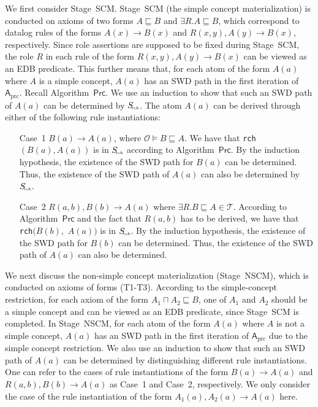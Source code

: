 We first consider Stage~SCM.
Stage~SCM (the simple concept materialization) is conducted on axioms of two forms $A\sqsubseteq B$
and $\exists R.A\sqsubseteq B$, which correspond to datalog rules of the forms $A(x)\rightarrow B(x)$
and $R(x,y),A(y)\rightarrow B(x)$, respectively. Since role assertions are supposed to be fixed
during Stage~SCM, the role $R$ in each rule of the form $R(x,y),A(y)\rightarrow B(x)$
can be viewed as an EDB predicate. This further means that,
for each atom of the form $A(a)$ where $A$ is a simple concept,
$A(a)$ has an SWD path in the first iteration of $\mathsf{A}_{\text{prc}}$.
Recall Algorithm~$\mathsf{Prc}$. We use an induction to show that
such an SWD path of $A(a)$ can be determined by $S_{\textit{\!\tiny rch}}$.
The atom $A(a)$ can be derived through either of the following rule instantiations:

\begin{enumerate}[leftmargin=12ex]
\item[Case~1] $B(a)\rightarrow A(a)$, where $\mathcal{O}\models
  B\sqsubseteq A$. We have
    that \texttt{rch}$(B(a),A(a))$ is in $S_{\textit{\!\tiny rch}}$ according to Algorithm~$\mathsf{Prc}$.
    By the induction hypothesis, the existence of the SWD path for $B(a)$ can be determined.
    Thus, the existence of the SWD path of $A(a)$ can also be determined by $S_{\textit{\!\tiny rch}}$.

\item[Case~2] $R(a,b),B(b)\rightarrow A(a)$ where $\exists R.B\sqsubseteq A\in\mathcal{T}$.
    According to Algorithm~$\mathsf{Prc}$ and the fact that $R(a,b)$ has to be derived,
    we have that \texttt{rch}$(B(b),$ $A(a))$ is in $S_{\textit{\!\tiny rch}}$.
    By the induction hypothesis, the existence of the SWD path for $B(b)$ can be determined.
    Thus, the existence of the SWD path of $A(a)$ can also be determined.
\end{enumerate}

We next discuss the non-simple concept materialization (Stage~NSCM), which is conducted on axioms of forms (T1-T3).
According to the simple-concept restriction, for each axiom of the form $A_1\sqcap A_2\sqsubseteq B$,
one of $A_1$ and $A_2$ should be a simple concept and can be viewed as an EDB predicate, since Stage~SCM is completed.
In Stage~NSCM, for each atom of the form $A(a)$ where $A$ is not a simple concept,
$A(a)$ has an SWD path in the first iteration of $\mathsf{A}_{\text{prc}}$ due to the simple concept restriction.
We also use an induction to show that
such an SWD path of $A(a)$ can be determined by distinguishing different rule instantiations.
One can refer to the cases of rule instantiations of the form
$B(a)\rightarrow A(a)$ and $R(a,b),B(b)\rightarrow A(a)$ as Case~1 and
Case~2, respectively. We only consider the case of the rule instantiation of the form $A_1(a),A_2(a)\rightarrow A(a)$
here.

